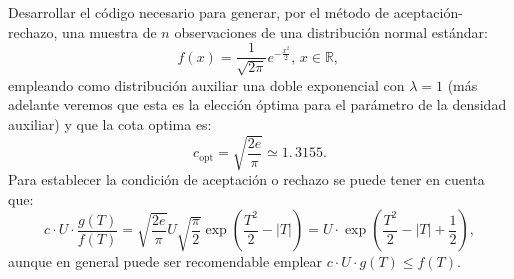 \documentclass[
]{book}
\theoremstyle{break}
\theoremstyle{definition}
\theoremstyle{definition}
\theoremstyle{definition}
\theoremstyle{remark}
\begin{document}
Desarrollar el código necesario para generar, por el método de
aceptación-rechazo, una muestra de \(n\) observaciones de una
distribución normal estándar:
\[f\left( x\right)  =\frac{1}{\sqrt{2\pi}}e^{-\frac{x^{2}}{2}}\text{, }x\in\mathbb{R}\text{, }\]
empleando como distribución auxiliar una doble exponencial con \(\lambda=1\)
(más adelante veremos que esta es la elección óptima para el parámetro de la densidad auxiliar) y que la cota optima
es:\[c_{\text{opt}}=\sqrt{\frac{2e}{\pi}}\simeq1.\,3155.\] Para
establecer la condición de aceptación o rechazo se puede tener en
cuenta que:
\[c\cdot U\cdot\frac{g\left( T\right)  }{f\left( T\right)  }=\sqrt{\frac
{2e}{\pi}}U\sqrt{\frac{\pi}{2}}\exp\left( \frac{T^{2}}{2}-\left\vert
T\right\vert \right)  =U\cdot\exp\left( \frac{T^{2}}{2}-\left\vert
T\right\vert +\frac{1}{2}\right)  ,\]
aunque en general puede ser recomendable emplear \(c\cdot U\cdot g\left( T\right) \leq f\left( T\right)\).
\end{document}
